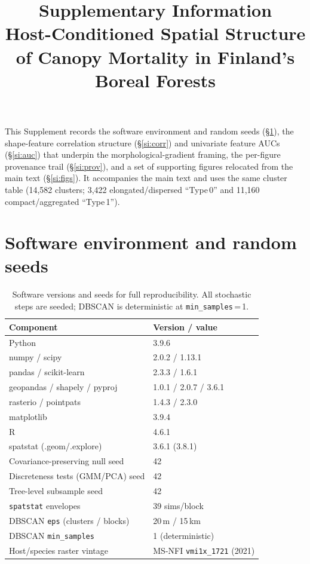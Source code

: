 \documentclass{article}
\title{\textbf{Supplementary Information}\\[2pt]
\large Host-Conditioned Spatial Structure of Canopy Mortality in Finland's Boreal Forests}
\date{}
\begin{document}
\maketitle
\vspace{-2em}

This Supplement records the software environment and random seeds (\S\ref{si:env}), the shape-feature
correlation structure (\S\ref{si:corr}) and univariate feature AUCs (\S\ref{si:auc}) that underpin the
morphological-gradient framing, the per-figure provenance trail (\S\ref{si:prov}), and a set of
supporting figures relocated from the main text (\S\ref{si:figs}). It accompanies
the main text and uses the same cluster table (14,582 clusters; 3,422 elongated/dispersed ``Type\,0''
and 11,160 compact/aggregated ``Type\,1'').

\section{Software environment and random seeds}
\label{si:env}

\begin{table}[h]
\centering
\small
\begin{tabular}{@{}ll@{}}
\toprule
\textbf{Component} & \textbf{Version / value} \\
\midrule
Python              & 3.9.6 \\
\quad numpy / scipy & 2.0.2 / 1.13.1 \\
\quad pandas / scikit-learn & 2.3.3 / 1.6.1 \\
\quad geopandas / shapely / pyproj & 1.0.1 / 2.0.7 / 3.6.1 \\
\quad rasterio / pointpats & 1.4.3 / 2.3.0 \\
\quad matplotlib & 3.9.4 \\
R                   & 4.6.1 \\
\quad spatstat (.geom/.explore) & 3.6.1 (3.8.1) \\
\midrule
Covariance-preserving null seed & 42 \\
Discreteness tests (GMM/PCA) seed & 42 \\
Tree-level subsample seed & 42 \\
\texttt{spatstat} envelopes & 39 sims/block \\
DBSCAN \texttt{eps} (clusters / blocks) & 20\,m / 15\,km \\
DBSCAN \texttt{min\_samples} & 1 (deterministic) \\
Host/species raster vintage & MS-NFI \texttt{vmi1x\_1721} (2021) \\
\bottomrule
\end{tabular}
\caption{Software versions and seeds for full reproducibility. All stochastic steps are seeded;
DBSCAN is deterministic at \texttt{min\_samples}\,=\,1.}
\label{tab:si-env}
\end{table}
\end{document}
